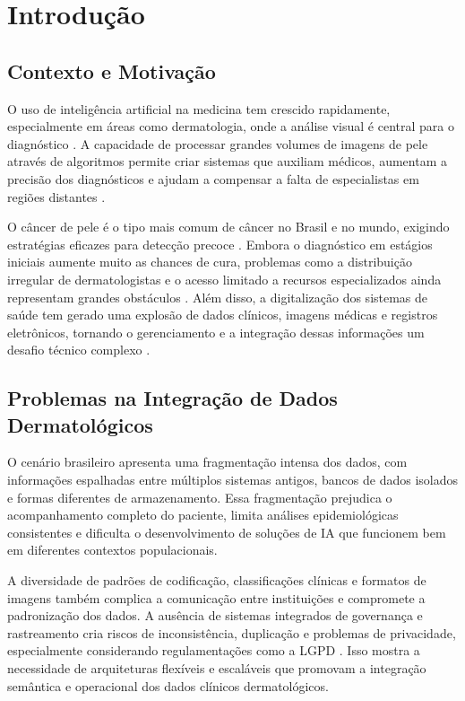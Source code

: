 \chapter{Introdução}

\section{Contexto e Motivação}

O uso de inteligência artificial na medicina tem crescido rapidamente, especialmente em áreas como dermatologia, onde a análise visual é central para o diagnóstico \cite{esteva2017dermatologist, topol2019high}. A capacidade de processar grandes volumes de imagens de pele através de algoritmos permite criar sistemas que auxiliam médicos, aumentam a precisão dos diagnósticos e ajudam a compensar a falta de especialistas em regiões distantes \cite{daneshjou2022disparities}.

O câncer de pele é o tipo mais comum de câncer no Brasil e no mundo, exigindo estratégias eficazes para detecção precoce \cite{who2020skin}. Embora o diagnóstico em estágios iniciais aumente muito as chances de cura, problemas como a distribuição irregular de dermatologistas e o acesso limitado a recursos especializados ainda representam grandes obstáculos \cite{freeman2020workforce, inca2020estimativa}. Além disso, a digitalização dos sistemas de saúde tem gerado uma explosão de dados clínicos, imagens médicas e registros eletrônicos, tornando o gerenciamento e a integração dessas informações um desafio técnico complexo \cite{raghupathi2014big, lehne2019digital}.

\section{Problemas na Integração de Dados Dermatológicos}

O cenário brasileiro apresenta uma fragmentação intensa dos dados, com informações espalhadas entre múltiplos sistemas antigos, bancos de dados isolados e formas diferentes de armazenamento. Essa fragmentação prejudica o acompanhamento completo do paciente, limita análises epidemiológicas consistentes e dificulta o desenvolvimento de soluções de IA que funcionem bem em diferentes contextos populacionais.

A diversidade de padrões de codificação, classificações clínicas e formatos de imagens também complica a comunicação entre instituições e compromete a padronização dos dados. A ausência de sistemas integrados de governança e rastreamento cria riscos de inconsistência, duplicação e problemas de privacidade, especialmente considerando regulamentações como a LGPD \cite{benfeldt2020data}. Isso mostra a necessidade de arquiteturas flexíveis e escaláveis que promovam a integração semântica e operacional dos dados clínicos dermatológicos.

